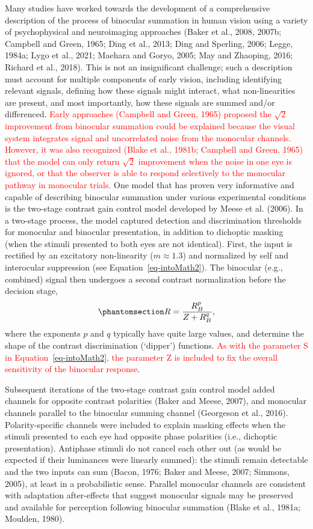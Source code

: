 \documentclass[
  12pt,
]{article}
\begin{document}
Many studies have worked towards the development of a comprehensive
description of the process of binocular summation in human vision using
a variety of psychophysical and neuroimaging approaches (Baker et al.,
2008, 2007b; Campbell and Green, 1965; Ding et al., 2013; Ding and
Sperling, 2006; Legge, 1984a; Lygo et al., 2021; Maehara and Goryo,
2005; May and Zhaoping, 2016; Richard et al., 2018). This is not an
insignificant challenge; such a description must account for multiple
components of early vision, including identifying relevant signals,
defining how these signals might interact, what non-linearities are
present, and most importantly, how these signals are summed and/or
differenced. \textcolor{red}{Early approaches (Campbell and Green, 1965)
proposed the \(\sqrt{2}\) improvement from binocular summation could be
explained because the visual system integrates signal and uncorrelated
noise from the monocular channels. However, it was also recognized
(Blake et al., 1981b; Campbell and Green, 1965) that the model can only
return \(\sqrt{2}\) improvement when the noise in one eye is ignored, or
that the observer is able to respond selectively to the monocular
pathway in monocular trials.} One model that has proven very informative
and capable of describing binocular summation under various experimental
conditions is the two-stage contrast gain control model developed by
Meese et al. (2006). In a two-stage process, the model captured
detection and discrimination thresholds for monocular and binocular
presentation, in addition to dichoptic masking (when the stimuli
presented to both eyes are not identical). First, the input is rectified
by an excitatory non-linearity (\(m \approx 1.3\)) and normalized by
self and interocular suppression (see Equation~\ref{eq-intoMath2}). The
binocular (e.g., combined) signal then undergoes a second contrast
normalization before the decision stage,
\begin{equation}\phantomsection\label{eq-IntroMathSecondStage}{
R = \frac{R_B^p}{Z + R_B^q},
}\end{equation} where the exponents \(p\) and \(q\) typically have quite
large values, and determine the shape of the contrast discrimination
(`dipper') functions. \textcolor{red}{As with the parameter S in
Equation~\ref{eq-intoMath2}, the parameter Z is included to fix the
overall sensitivity of the binocular response}.

Subsequent iterations of the two-stage contrast gain control model added
channels for opposite contrast polarities (Baker and Meese, 2007), and
monocular channels parallel to the binocular summing channel (Georgeson
et al., 2016). Polarity-specific channels were included to explain
masking effects when the stimuli presented to each eye had opposite
phase polarities (i.e., dichoptic presentation). Antiphase stimuli do
not cancel each other out (as would be expected if their luminances were
linearly summed): the stimuli remain detectable and the two inputs can
sum (Bacon, 1976; Baker and Meese, 2007; Simmons, 2005), at least in a
probabilistic sense. Parallel monocular channels are consistent with
adaptation after-effects that suggest monocular signals may be preserved
and available for perception following binocular summation (Blake et
al., 1981a; Moulden, 1980).
\end{document}
